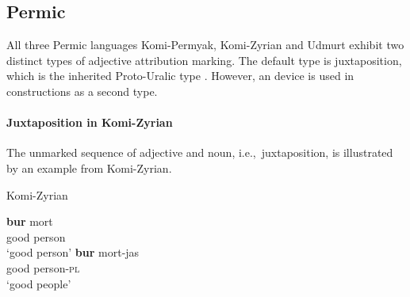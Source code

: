 \subsection{Permic}
All three Permic languages Komi-Permyak, Komi-Zyrian and Udmurt exhibit two distinct types of adjective attribution marking. The default type is juxtaposition, which is the inherited Proto\hyp{}Uralic type \citep[80–81]{decsy1990}. However, an  device is used in  constructions as a second type.

\paragraph*{Juxtaposition in Komi-Zyrian}
The unmarked sequence of adjective and noun, i.e.,~juxtaposition, is illustrated by an example from Komi-Zyrian.
\begin{exe}
\ex \rm{Komi-Zyrian \citep[287]{lytkin1966a}}
\begin{xlist} 
\ex
\gll 		\textbf{bur} 	mort\\
		good	person\\
\glt		‘good person’
\ex
\gll		\textbf{bur}	mort-jas\\
		good	person-\textsc{pl}\\
\glt		‘good people’
\end{xlist}
\end{exe}

